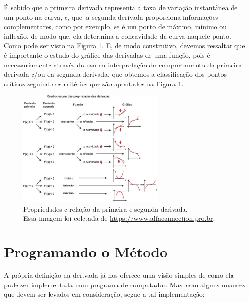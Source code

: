 É sabido que a primeira derivada representa a taxa de variação instantânea de
um ponto na curva, e, que, a segunda derivada proporciona informações
complementares, como por exemplo, se é um ponto de máximo, mínimo ou inflexão,
de modo que, ela determina a concavidade da curva naquele ponto. Como pode ser
visto na Figura \ref{relacao_primeira_segunda_derivada}. E, de modo construtivo,
devemos ressaltar que é importante o estudo do gráfico das derivadas de uma
função, pois é necessariamente através do uso da interpretação do comportamento
da primeira derivada e/ou da segunda derivada, que obtemos a classificação dos
pontos críticos seguindo os critérios que são apontados na Figura \ref{relacao_primeira_segunda_derivada}.

\begin{figure}[h]
    \centering
    \includegraphics[width=0.65\textwidth]{src/relacao_primeira_segunda_derivada.jpg}
    \captionsetup{justification=centering}
    \caption{
        Propriedades e relação da primeira e segunda derivada.\\
        \tiny Essa imagem foi coletada de \url{https://www.alfaconnection.pro.br}.
    }
    \label{relacao_primeira_segunda_derivada}
\end{figure}


\section{{Programando o Método}}

\hspace{0.8cm}


A própria definição da derivada já nos oferece uma visão simples de como
ela pode ser implementada num programa de computador. Mas, com alguns nuances
que devem ser levados em consideração, segue a tal implementação:




